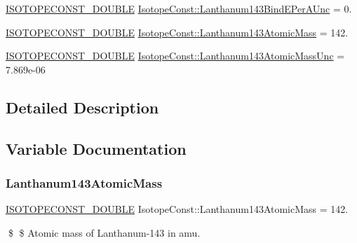 \begin{DoxyCompactItemize}
\mbox{\hyperlink{group___isotope_const-_macros_ga8f45a7272ce02c0b4c65c44636ed719a}{I\+S\+O\+T\+O\+P\+E\+C\+O\+N\+S\+T\+\_\+\+D\+O\+U\+B\+LE}} \mbox{\hyperlink{group___isotope_const-_lanthanum-_la143_ga443fe5956682651194476cc61efcb1cd}{Isotope\+Const\+::\+Lanthanum143\+Bind\+E\+Per\+A\+Unc}} = 0.
\item 
\mbox{\hyperlink{group___isotope_const-_macros_ga8f45a7272ce02c0b4c65c44636ed719a}{I\+S\+O\+T\+O\+P\+E\+C\+O\+N\+S\+T\+\_\+\+D\+O\+U\+B\+LE}} \mbox{\hyperlink{group___isotope_const-_lanthanum-_la143_ga1803a1b904a496b56b40e1dfea73d13d}{Isotope\+Const\+::\+Lanthanum143\+Atomic\+Mass}} = 142.
\item 
\mbox{\hyperlink{group___isotope_const-_macros_ga8f45a7272ce02c0b4c65c44636ed719a}{I\+S\+O\+T\+O\+P\+E\+C\+O\+N\+S\+T\+\_\+\+D\+O\+U\+B\+LE}} \mbox{\hyperlink{group___isotope_const-_lanthanum-_la143_gaec6c0809614f807cf4a2a5ae12628771}{Isotope\+Const\+::\+Lanthanum143\+Atomic\+Mass\+Unc}} = 7.\+869e-\/06
\end{DoxyCompactItemize}


\subsection{Detailed Description}


\subsection{Variable Documentation}
\mbox{\label{group___isotope_const-_lanthanum-_la143_ga1803a1b904a496b56b40e1dfea73d13d}} 
\subsubsection{\texorpdfstring{Lanthanum143\+Atomic\+Mass}{Lanthanum143AtomicMass}}
{\footnotesize\ttfamily \mbox{\hyperlink{group___isotope_const-_macros_ga8f45a7272ce02c0b4c65c44636ed719a}{I\+S\+O\+T\+O\+P\+E\+C\+O\+N\+S\+T\+\_\+\+D\+O\+U\+B\+LE}} Isotope\+Const\+::\+Lanthanum143\+Atomic\+Mass = 142.}

\$ \$ Atomic mass of Lanthanum-\/143 in amu. \mbox{\label{group___isotope_const-_lanthanum-_la143_gaec6c0809614f807cf4a2a5ae12628771}} 
